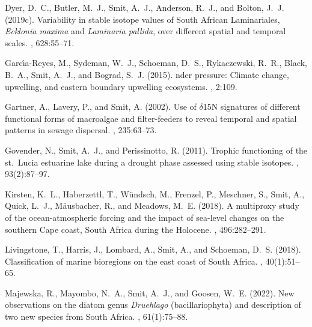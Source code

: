 \begin{thebibliography}{}
  Dyer, D.~C., Butler, M.~J., Smit, A.~J., Anderson, R.~J., and Bolton, J.~J.
    (2019c).
  \newblock Variability in stable isotope values of {S}outh {A}frican
    {L}aminariales, \emph{Ecklonia maxima} and \emph{Laminaria pallida}, over
    different spatial and temporal scales.
  , 628:55--71.
  
  Garc{\'\i}a-Reyes, M., Sydeman, W.~J., Schoeman, D.~S., Rykaczewski, R.~R.,
    Black, B.~A., Smit, A.~J., and Bograd, S.~J. (2015).
  nder pressure: {C}limate change, upwelling, and eastern boundary
    upwelling ecosystems.
  , 2:109.
  
  Gartner, A., Lavery, P., and Smit, A. (2002).
  \newblock Use of $\delta$15{N} signatures of different functional forms of
    macroalgae and filter-feeders to reveal temporal and spatial patterns in
    sewage dispersal.
  , 235:63--73.
  
  Govender, N., Smit, A.~J., and Perissinotto, R. (2011).
  \newblock Trophic functioning of the st.~{L}ucia estuarine lake during a
    drought phase assessed using stable isotopes.
  , 93(2):87--97.
  
  Kirsten, K.~L., Haberzettl, T., W{\"u}ndsch, M., Frenzel, P., Meschner, S.,
    Smit, A., Quick, L.~J., M{\"a}usbacher, R., and Meadows, M.~E. (2018).
  \newblock A multiproxy study of the ocean-atmospheric forcing and the impact of
    sea-level changes on the southern {C}ape coast, {S}outh {A}frica during the
    {H}olocene.
  ,
    496:282--291.
  
  Livingstone, T., Harris, J., Lombard, A., Smit, A., and Schoeman, D.~S. (2018).
  \newblock Classification of marine bioregions on the east coast of {S}outh
    {A}frica.
  , 40(1):51--65.
  
  Majewska, R., Mayombo, N.~A., Smit, A.~J., and Goosen, W.~E. (2022).
  \newblock New observations on the diatom genus \emph{Druehlago}
    (bacillariophyta) and description of two new species from {S}outh {A}frica.
  , 61(1):75--88.
  

\end{thebibliography}
